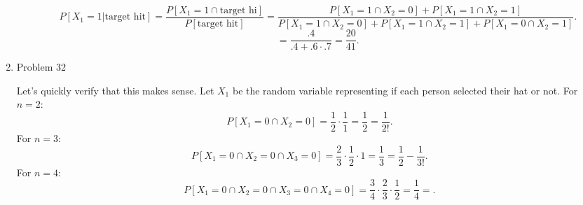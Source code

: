 \documentclass[a4paper]{article}
\begin{document}
\begin{enumerate}
\begin{enumerate}
        \[
          P[X_1 = 1 | \text{target hit}] = \frac{P[X_1 = 1 \cap \text{target hi}]}{P[\text{target hit}]} = 
          \frac{P[X_1 = 1 \cap X_2 = 0] + P[X_1 = 1 \cap X_2 = 1]}{P[X_1 =1 \cap X_2 = 0] + P[X_1 = 1 \cap X_2 = 1] 
          + P[X_1 = 0 \cap X_2 = 1]}
        .\]
        \[
        = \frac{.4}{.4 + .6 \cdot .7} = \frac{20}{41}
        .\] 
    \end{enumerate}
  \item Problem 32
    \begin{note}
      Let's quickly verify that this makes sense. Let $X_1$ be the random variable representing if each person
      selected their hat or not. For $n=2$:
       \[
         P[X_1 = 0 \cap X_2 = 0] = \frac{1}{2} \cdot \frac{1}{1} = \frac{1}{2} = \frac{1}{2!} 
      .\] 
      For $n=3$:
       \[
         P[X_1 = 0 \cap X_2 = 0 \cap X_3=0] = \frac{2}{3} \cdot \frac{1}{2} \cdot 1 = \frac{1}{3} =
         \frac{1}{2} - \frac{1}{3!} 
      .\] 
      For $n=4$:
       \[
         P[X_1 = 0 \cap X_2 = 0 \cap X_3=0 \cap X_4 = 0] = \frac{3}{4} \cdot \frac{2}{3} \cdot \frac{1}{2} = \frac{1}{4}
         = 
      .\] 
    \end{note}
\end{enumerate}
\end{document}
